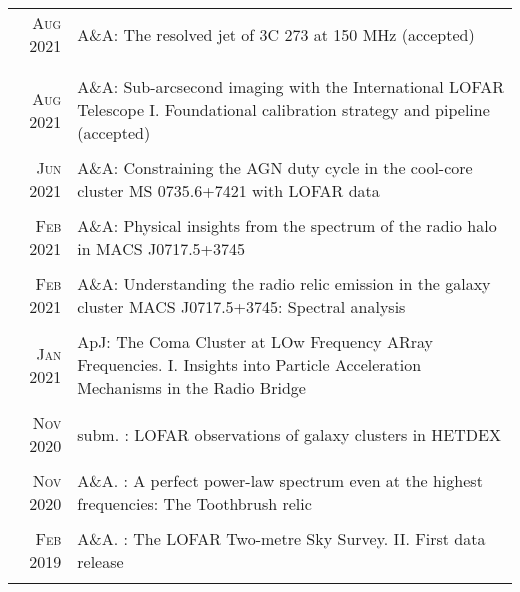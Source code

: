 \documentclass[11pt,a4paper,notitlepage]{article}
\begin{document}
\begin{tabular}{r|p{12.5cm}}
	
	\textsc{Aug 2021} & A\&A: The resolved jet of 3C 273 at 150 MHz (accepted) \\
	\multicolumn{2}{c}{} \\

	\multicolumn{2}{c}{} \\	\textsc{Aug 2021} & A\&A: Sub-arcsecond imaging with the International LOFAR Telescope I. Foundational calibration strategy and pipeline (accepted) \\
	\multicolumn{2}{c}{} \\
	
	\textsc{Jun 2021} & A\&A: Constraining the AGN duty cycle in the cool-core cluster MS 0735.6+7421 with LOFAR data
	 \citep{2021AA...650A.170B} \\
	\multicolumn{2}{c}{} \\


	\textsc{Feb 2021} & A\&A: Physical insights from the spectrum of the radio halo in MACS J0717.5+3745 \citep{2021AA...646A.135R} \\
	\multicolumn{2}{c}{} \\
	
	\textsc{Feb 2021} & A\&A: Understanding the radio relic emission in the galaxy cluster MACS J0717.5+3745: Spectral analysis \citep{2021AA...646A..56R} \\
	\multicolumn{2}{c}{} \\
	
	\textsc{Jan 2021} & ApJ: The Coma Cluster at LOw Frequency ARray Frequencies. I. Insights into Particle Acceleration Mechanisms in the Radio Bridge \citep{2021ApJ...907...32B} \\
	\multicolumn{2}{c}{} \\
	
	\textsc{Nov 2020} & subm. : LOFAR observations of galaxy clusters in HETDEX \citep{2020arXiv201102387V} \\
	\multicolumn{2}{c}{} \\
	
	\textsc{Nov 2020} & A\&A. : A perfect power-law spectrum even at the highest frequencies: The Toothbrush relic\citep{2020AA...642L..13R} \\
	\multicolumn{2}{c}{} \\
%	
	
	\textsc{Feb 2019} & A\&A. : The LOFAR Two-metre Sky Survey. II. First data release \citep{2019AA...622A...1S} \\
	\multicolumn{2}{c}{} \\
	
\end{tabular}
\end{document}
